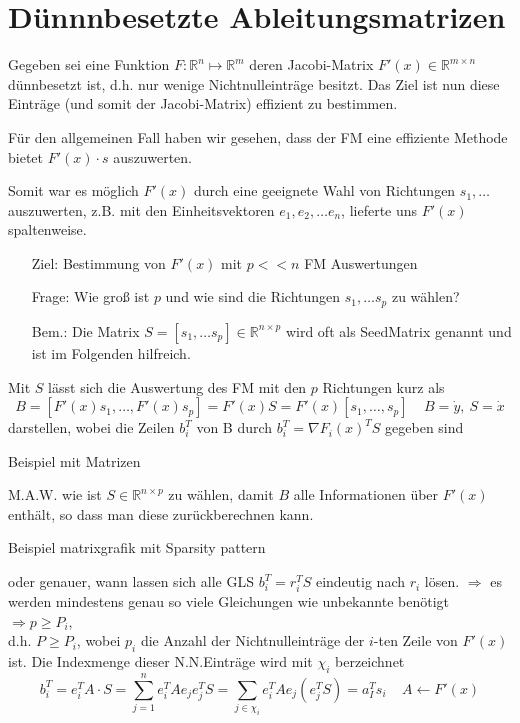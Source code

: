 \section{Dünnnbesetzte Ableitungsmatrizen}
\label{chap:sparsemats}

Gegeben sei eine Funktion $F:\mathbb{R}^n\mapsto\mathbb{R}^m$ deren Jacobi-Matrix $F'(x) \in \mathbb{R}^{m\times n}$ dünnbesetzt ist, d.h. nur wenige Nichtnulleinträge besitzt. Das Ziel ist nun diese Einträge (und somit der Jacobi-Matrix) effizient zu bestimmen.

\noindent
Für den allgemeinen Fall haben wir gesehen, dass der FM eine effiziente Methode bietet $F'(x)\cdot s$ auszuwerten.

Somit war es möglich $F'(x)$ durch eine geeignete Wahl von Richtungen  $s_1,\dots$ auszuwerten, z.B. mit den Einheitsvektoren $e_1,e_2, \dots e_n$, lieferte uns $F'(x)$ spaltenweise.\\


\begin{itemize}
	\item[Ziel:] Bestimmung von $F'(x)$ mit $p <<n$ FM Auswertungen
	\item[Frage:]Wie groß ist $p$ und wie sind die Richtungen $s_1,\dots s_p$ zu wählen?
	\item[Bem.:] Die Matrix $S = [s_1, \dots s_p] \in \mathbb{R}^{n\times p}$ wird oft als \glqq Seed\grqq Matrix genannt und ist im Folgenden hilfreich.
\end{itemize}

Mit $S$ lässt sich die Auswertung des FM mit den $p$ Richtungen kurz als 
$$B = [ F'(x)s_1 , \dots , F'(x)s_p] = F'(x) S = F'(x) [s_1,\dots,s_p]\ \ \ \ \  B= \dot{y},\ S=\dot{x}$$
darstellen, wobei die Zeilen $b_i^T$ von B durch $b_i^T = \nabla F_i(x)^TS$ gegeben sind

Beispiel mit Matrizen

M.A.W. wie ist $S\in\mathbb{R}^{n\times p}$ zu wählen, damit $B$ alle Informationen über $F'(x)$ enthält, so dass man diese zurückberechnen kann.

Beispiel matrixgrafik mit Sparsity pattern

oder genauer, wann lassen sich alle GLS $b_i^T = r_i^TS$ eindeutig nach $r_i$ lösen.
$\Rightarrow$ es werden mindestens genau so viele Gleichungen wie unbekannte benötigt\\
$\Rightarrow p \ge P_i$,\\

d.h. $P \geq P_i$, wobei $p_i$ die Anzahl der Nichtnulleinträge der $i$-ten Zeile von $F'(x)$ ist. Die Indexmenge dieser N.N.Einträge wird mit $\chi_i$ berzeichnet
$$b_i^T = e_i^T A \cdot S = \sum_{j=1}^n e_i^T A e_j e_j^T S =\sum_{j\in \chi_i} e_i^T A e_j (e_j^T S) = a_I^T s_i \ \ \ \ \ A \leftarrow F'(x)$$

